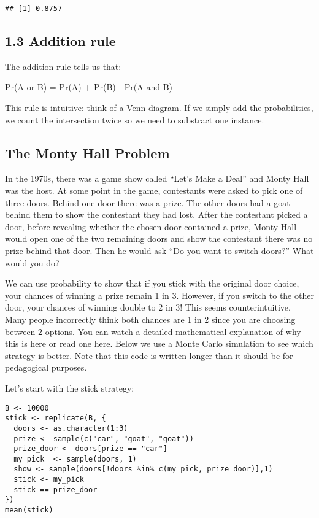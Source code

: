 \documentclass[
]{article}
\begin{document}
\begin{verbatim}
## [1] 0.8757
\end{verbatim}

\hypertarget{addition-rule}{%
\subsection{1.3 Addition rule}\label{addition-rule}}

The addition rule tells us that:

Pr(A or B) = Pr(A) + Pr(B) - Pr(A and B)

This rule is intuitive: think of a Venn diagram. If we simply add the
probabilities, we count the intersection twice so we need to substract
one instance.

\hypertarget{the-monty-hall-problem}{%
\subsection{The Monty Hall Problem}\label{the-monty-hall-problem}}

In the 1970s, there was a game show called ``Let's Make a Deal'' and
Monty Hall was the host. At some point in the game, contestants were
asked to pick one of three doors. Behind one door there was a prize. The
other doors had a goat behind them to show the contestant they had lost.
After the contestant picked a door, before revealing whether the chosen
door contained a prize, Monty Hall would open one of the two remaining
doors and show the contestant there was no prize behind that door. Then
he would ask ``Do you want to switch doors?'' What would you do?

We can use probability to show that if you stick with the original door
choice, your chances of winning a prize remain 1 in 3. However, if you
switch to the other door, your chances of winning double to 2 in 3! This
seems counterintuitive. Many people incorrectly think both chances are 1
in 2 since you are choosing between 2 options. You can watch a detailed
mathematical explanation of why this is here or read one here. Below we
use a Monte Carlo simulation to see which strategy is better. Note that
this code is written longer than it should be for pedagogical purposes.

Let's start with the stick strategy:

\begin{verbatim}
B <- 10000
stick <- replicate(B, {
  doors <- as.character(1:3)
  prize <- sample(c("car", "goat", "goat"))
  prize_door <- doors[prize == "car"]
  my_pick  <- sample(doors, 1)
  show <- sample(doors[!doors %in% c(my_pick, prize_door)],1)
  stick <- my_pick
  stick == prize_door
})
mean(stick)
\end{verbatim}
\end{document}

